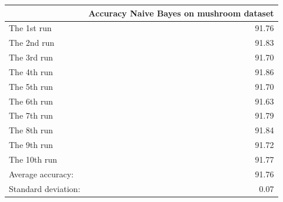 \begin{tabular}{lr}
\toprule
{} &  Accuracy Naive Bayes on mushroom dataset \\
\midrule
The 1st run         &                                     91.76 \\
The 2nd run         &                                     91.83 \\
The 3rd run         &                                     91.70 \\
The 4th run         &                                     91.86 \\
The 5th run         &                                     91.70 \\
The 6th run         &                                     91.63 \\
The 7th run         &                                     91.79 \\
The 8th run         &                                     91.84 \\
The 9th run         &                                     91.72 \\
The 10th run        &                                     91.77 \\
Average accuracy:   &                                     91.76 \\
Standard deviation: &                                      0.07 \\
\bottomrule
\end{tabular}
